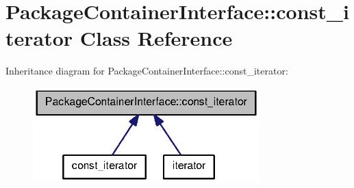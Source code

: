 \section{\-Package\-Container\-Interface\-:\-:const\-\_\-iterator \-Class \-Reference}
\label{classAPT_1_1PackageContainerInterface_1_1const__iterator}


\-Inheritance diagram for \-Package\-Container\-Interface\-:\-:const\-\_\-iterator\-:
\nopagebreak
\begin{figure}[H]
\begin{center}
\leavevmode
\includegraphics[width=248pt]{classAPT_1_1PackageContainerInterface_1_1const__iterator__inherit__graph}
\end{center}
\end{figure}
